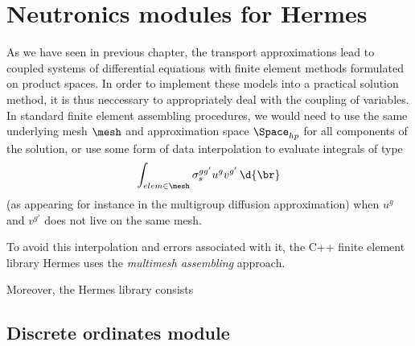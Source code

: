 \chapter{Neutronics modules for Hermes}\label{chap:hermes}

As we have seen in previous chapter, the transport approximations lead to coupled systems of differential equations with
finite element methods formulated on product spaces. In order to implement these models into a practical solution
method, it is thus neccessary to appropriately deal with the coupling of variables. In standard finite element
assembling procedures, we would need to use the same underlying mesh $\mesh$ and approximation space $\Space_{hp}$ for
all components of the solution, or use some form of data interpolation to evaluate integrals of type
$$
	\int_{elem\in\mesh} \sigma_s^{gg'} u^g v^{g'}\,\d{\br}
$$
(as appearing for instance in the multigroup diffusion approximation) when $u^g$ and $v^{g'}$ does not live on the same
mesh.

To avoid this interpolation and errors associated with it, the C++ finite element library Hermes uses the
\textit{multimesh assembling} approach. 

Moreover, the Hermes library consists 

\section{Discrete ordinates module}\label{sec:DO}